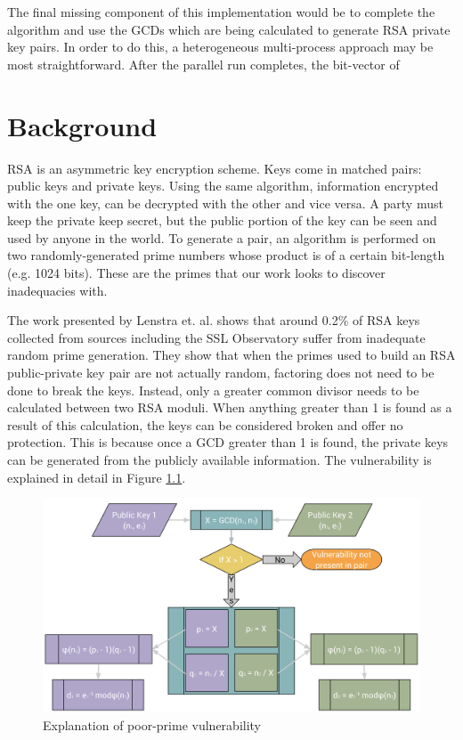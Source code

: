 \documentclass[12pt]{ucthesis}
\begin{document}
The final missing component of this implementation would be to complete the 
algorithm and use the GCDs which are being calculated to generate RSA private 
key pairs. In order to do this, a heterogeneous multi-process approach may be 
most straightforward. After the parallel run completes, the bit-vector of 

\chapter{Background}
\label{background}
RSA is an asymmetric key encryption scheme. Keys come in matched pairs:
public keys and private keys. Using the same algorithm, information encrypted
with the one key, can be decrypted with the other and vice versa. A party must
keep the private keep secret, but the public portion of the key can be seen and
used by anyone in the world. To generate a pair, an algorithm is performed on
two randomly-generated prime numbers whose product is of a certain bit-length
(e.g. 1024 bits). These are the primes that our work looks to discover
inadequacies with.

The work presented by Lenstra et. al. \cite{lenstra2012ron} shows that around
0.2\% of RSA keys collected from sources including the SSL Observatory suffer
from inadequate random prime generation. They show that when the primes used to
build an RSA public-private key pair are not actually random, factoring does
not need to be done to break the keys. Instead, only a greater common divisor
needs to be calculated between two RSA moduli. When anything greater than 1 is
found as a result of this calculation, the keys can be considered broken and
offer no protection. This is because once a GCD greater than 1 is found, the
private keys can be generated from the publicly available information. The
vulnerability is explained in detail in Figure \ref{fig:vuln}.

\begin{figure}
   \centering
   \includegraphics[width=\linewidth]{vulnerability.png}
   \caption{Explanation of poor-prime vulnerability}
   \label{fig:vuln}
\end{figure}
\end{document}
